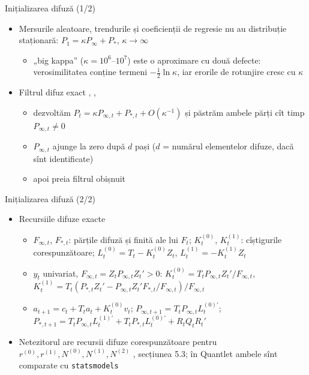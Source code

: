 \begin{frame}{Inițializarea difuză (1/2)}
\itemsize{\small}
\begin{itemize}
    \item Mersurile aleatoare, trendurile și coeficienții de regresie nu au distribuție staționară: $P_1 = \kappa P_\infty + P_*$, $\kappa \to \infty$
    \begin{itemize}
        \item „big kappa” ($\kappa = 10^6$--$10^7$) este o aproximare cu două defecte: verosimilitatea conține termeni $-\frac12\ln\kappa$, iar erorile de rotunjire cresc cu $\kappa$
    \end{itemize}
    \item Filtrul difuz exact , , 
    \begin{itemize}
        \item dezvoltăm $P_t = \kappa P_{\infty,t} + P_{*,t} + O(\kappa^{-1})$ și păstrăm ambele părți cît timp $P_{\infty,t} \ne 0$
        \item $P_{\infty,t}$ ajunge la zero după $d$ pași ($d$ = numărul elementelor difuze, dacă sînt identificate)
        \item apoi preia filtrul obișnuit
    \end{itemize}
\end{itemize}
\end{frame}

\begin{frame}{Inițializarea difuză (2/2)}
\itemsize{\footnotesize}
\begin{itemize}
    \item Recursiile difuze exacte
    \begin{itemize}
        \item $F_{\infty,t}$, $F_{*,t}$: părțile difuză și finită ale lui $F_t$; $K^{(0)}_t$, $K^{(1)}_t$: cîștigurile corespunzătoare; $L^{(0)}_t = T_t - K^{(0)}_tZ_t$, $L^{(1)}_t = -K^{(1)}_tZ_t$
        \item $y_t$ univariat, $F_{\infty,t} = Z_tP_{\infty,t}Z_t' > 0$: $K^{(0)}_t = T_tP_{\infty,t}Z_t'/F_{\infty,t}$, $K^{(1)}_t = T_t(P_{*,t}Z_t' - P_{\infty,t}Z_t'F_{*,t}/F_{\infty,t})/F_{\infty,t}$
        \item $a_{t+1} = c_t + T_ta_t + K^{(0)}_tv_t$; $P_{\infty,t+1} = T_tP_{\infty,t}L^{(0)\prime}_t$; $P_{*,t+1} = T_tP_{\infty,t}L^{(1)\prime}_t + T_tP_{*,t}L^{(0)\prime}_t + R_tQ_tR_t'$
    \end{itemize}
    \item Netezitorul are recursii difuze corespunzătoare pentru $r^{(0)}, r^{(1)}, N^{(0)}, N^{(1)}, N^{(2)}$ , secțiunea 5.3; în Quantlet ambele sînt comparate cu \texttt{statsmodels}
\end{itemize}
\end{frame}

